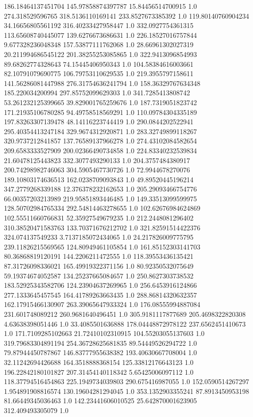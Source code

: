 186.18464137451704	145.97858874397787	15.84456514700915	1.0
274.318529596765	318.5136110169141	233.8527673385392	1.0
119.80140760904234	34.16656805561192	316.40233427958447	1.0
332.0927754361315	113.65608740445077	139.6276673686631	1.0
226.18527016757844	9.677328236048348	157.53877111762068	1.0
28.66961302027319	20.211994686545122	201.38255253085865	1.0
322.9413096854993	89.68262774328643	74.15445406950343	1.0
104.58384616003661	82.10791079690775	106.79753110629535	1.0
219.3955797158611	141.56286081447988	276.31754636241794	1.0
158.36329767634348	185.220034200994	297.85752099629303	1.0
341.7285413808742	53.261232125399665	39.829001765259676	1.0
187.7319051823742	171.21935106780285	94.49758518569291	1.0
110.09784304335189	197.83263307139478	48.14116223744419	1.0
290.0844202522941	295.40354413247184	329.9674312920871	1.0
283.32749899118267	320.9737212841857	137.76589137966278	1.0
274.43102084582654	209.6583333527909	200.02366490734858	1.0
224.83340232539834	21.60478125443823	332.3077493290133	1.0
204.3757484380917	200.74298982746063	304.5905467730726	1.0
72.9944678270076	189.10803174636513	162.0238709093843	1.0
49.89520445196214	347.2779268339188	12.376378232162653	1.0
205.29093466754776	66.00357203213989	219.95851893446485	1.0
149.33513099599975	128.50702984765334	292.54814463278655	1.0
102.62676984624869	102.55511660766831	52.35927549679235	1.0
212.2448081296402	310.38520471583763	133.70371676212702	1.0
321.82591514422376	324.074137549233	3.7137185072434065	1.0
24.217826009775795	239.11826215569565	124.80949461105854	1.0
161.85152303141703	80.36868819120191	144.2206211472555	1.0
118.39553436135421	87.31726098336021	165.49919322371156	1.0
80.92350532075649	59.19374674052587	134.25237665084657	1.0
250.8627303738532	183.52925343582706	124.23904637269965	1.0
256.6453916124866	277.1333645457545	164.41789263663435	1.0
288.86814320632357	162.17915466130907	263.39065647933324	1.0
176.08555994887084	231.601748089212	260.9681640496451	1.0
305.9181117877689	205.4698322820308	4.63638398051446	1.0
33.4085501636888	178.04448872978122	237.6562451410673	1.0
171.7109285102663	21.72410102310915	104.55203055137603	1.0
319.79683304891194	254.36728625681835	89.54449526294722	1.0
79.87944450787867	146.83777955638382	193.40630667708004	1.0
32.11242694426688	164.3518888368154	125.33812176643123	1.0
196.22842180101827	207.31454140118342	5.65425006097112	1.0
118.37794516454863	225.1949734039803	290.675416987055	1.0
152.0590514267297	1.954891908816574	130.19604281294045	1.0
353.1352903355241	87.8913450953198	81.66449345036463	1.0
142.23441606010525	25.642870001623905	312.409493305079	1.0

